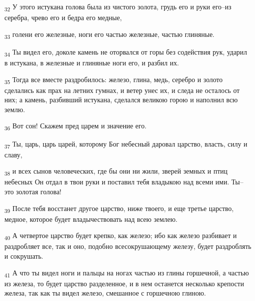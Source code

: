 \begin{tcolorbox}
\textsubscript{32} У этого истукана голова была из чистого золота, грудь его и руки его--из серебра, чрево его и бедра его медные,
\end{tcolorbox}
\begin{tcolorbox}
\textsubscript{33} голени его железные, ноги его частью железные, частью глиняные.
\end{tcolorbox}
\begin{tcolorbox}
\textsubscript{34} Ты видел его, доколе камень не оторвался от горы без содействия рук, ударил в истукана, в железные и глиняные ноги его, и разбил их.
\end{tcolorbox}
\begin{tcolorbox}
\textsubscript{35} Тогда все вместе раздробилось: железо, глина, медь, серебро и золото сделались как прах на летних гумнах, и ветер унес их, и следа не осталось от них; а камень, разбивший истукана, сделался великою горою и наполнил всю землю.
\end{tcolorbox}
\begin{tcolorbox}
\textsubscript{36} Вот сон! Скажем пред царем и значение его.
\end{tcolorbox}
\begin{tcolorbox}
\textsubscript{37} Ты, царь, царь царей, которому Бог небесный даровал царство, власть, силу и славу,
\end{tcolorbox}
\begin{tcolorbox}
\textsubscript{38} и всех сынов человеческих, где бы они ни жили, зверей земных и птиц небесных Он отдал в твои руки и поставил тебя владыкою над всеми ими. Ты--это золотая голова!
\end{tcolorbox}
\begin{tcolorbox}
\textsubscript{39} После тебя восстанет другое царство, ниже твоего, и еще третье царство, медное, которое будет владычествовать над всею землею.
\end{tcolorbox}
\begin{tcolorbox}
\textsubscript{40} А четвертое царство будет крепко, как железо; ибо как железо разбивает и раздробляет все, так и оно, подобно всесокрушающему железу, будет раздроблять и сокрушать.
\end{tcolorbox}
\begin{tcolorbox}
\textsubscript{41} А что ты видел ноги и пальцы на ногах частью из глины горшечной, а частью из железа, то будет царство разделенное, и в нем останется несколько крепости железа, так как ты видел железо, смешанное с горшечною глиною.
\end{tcolorbox}
